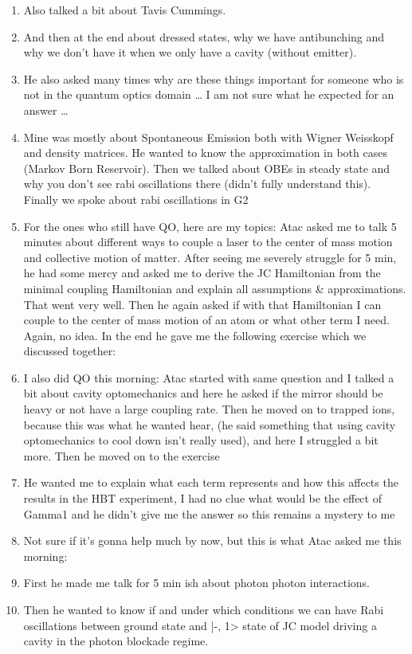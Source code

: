 \documentclass{article}%
\begin{document}
\begin{enumerate}
\item%
Also talked a bit about Tavis Cummings. %
\item%
And then at the end about dressed states, why we have antibunching and why we don’t have it when we only have a cavity (without emitter). %
\item%
He also asked many times why are these things important for someone who is not in the quantum optics domain … I am not sure what he expected for an answer …%
\item%
Mine was mostly about Spontaneous Emission both with Wigner Weisskopf and density matrices. He wanted to know the approximation in both cases (Markov Born Reservoir). Then we talked about OBEs in steady state and why you don’t see rabi oscillations there (didn’t fully understand this). Finally we spoke about rabi oscillations in G2%
\item%
For the ones who still have QO, here are my topics: Atac asked me to talk 5 minutes about different ways to couple a laser to the center of mass motion and collective motion of matter. After seeing me severely struggle for 5 min, he had some mercy and asked me to derive the JC Hamiltonian from the minimal coupling Hamiltonian and explain all assumptions \& approximations. That went very well. Then he again asked if with that Hamiltonian I can couple to the center of mass motion of an atom or what other term I need. Again, no idea. In the end he gave me the following exercise which we discussed together:%
\item%
I also did QO this morning: Atac started with same question and I talked a bit about cavity optomechanics and here he asked if the mirror should be heavy or not have a large coupling rate. Then he moved on to trapped ions, because this was what he wanted hear, (he said something that using cavity optomechanics to cool down isn't really used), and here I struggled a bit more. Then he moved on to the exercise%
\item%
He wanted me to explain what each term represents and how this affects the results in the HBT experiment, I had no clue what would be the effect of Gamma1 and he didn't give me the answer so this remains a mystery to me%
\item%
Not sure if it's gonna help much by now, but this is what Atac asked me this morning:%
\item%
First he made me talk for 5 min ish about photon photon interactions.%
\item%
Then he wanted to know if and under which conditions we can have Rabi oscillations between ground state and |{-}, 1> state of JC model driving a cavity in the photon blockade regime.%

\end{enumerate}
\end{document}

